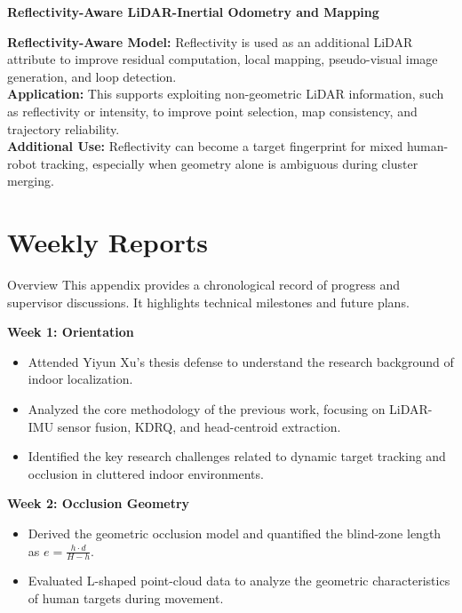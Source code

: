 \documentclass[11pt,a4paper]{report}
\newcommand{\boxitemtitle}[1]{
    \vspace{0.5em}
    {\large\textbf{\color{DeepBlue} #1}}\par
    \vspace{0.8em}
}
\begin{document}
\boxitemtitle{Reflectivity-Aware LiDAR-Inertial Odometry and Mapping~\cite{dong2023rliom}}
\begin{contentbox}
    \textbf{Reflectivity-Aware Model:} Reflectivity is used as an additional LiDAR attribute to improve residual computation, local mapping, pseudo-visual image generation, and loop detection. \\
    \textbf{Application:} This supports exploiting non-geometric LiDAR information, such as reflectivity or intensity, to improve point selection, map consistency, and trajectory reliability. \\
    \textbf{Additional Use:} Reflectivity can become a target fingerprint for mixed human-robot tracking, especially when geometry alone is ambiguous during cluster merging.
\end{contentbox}

\newpage
\chapter{Weekly Reports}
\begin{sectionintro}{Overview}
This appendix provides a chronological record of progress and supervisor discussions. It highlights technical milestones and future plans.
\end{sectionintro}

\boxitemtitle{Week 1: Orientation}
\begin{contentbox}
    \begin{itemize}[leftmargin=*, nosep]
        \item Attended Yiyun Xu's thesis defense to understand the research background of indoor localization.
        \item Analyzed the core methodology of the previous work, focusing on LiDAR-IMU sensor fusion, KDRQ, and head-centroid extraction.
        \item Identified the key research challenges related to dynamic target tracking and occlusion in cluttered indoor environments.
    \end{itemize}
\end{contentbox}

\boxitemtitle{Week 2: Occlusion Geometry}
\begin{contentbox}
    \begin{itemize}[leftmargin=*, nosep]
        \item Derived the geometric occlusion model and quantified the blind-zone length as $e = \frac{h \cdot d}{H-h}$.
        \item Evaluated L-shaped point-cloud data to analyze the geometric characteristics of human targets during movement.
    \end{itemize}
\end{contentbox}
\end{document}
